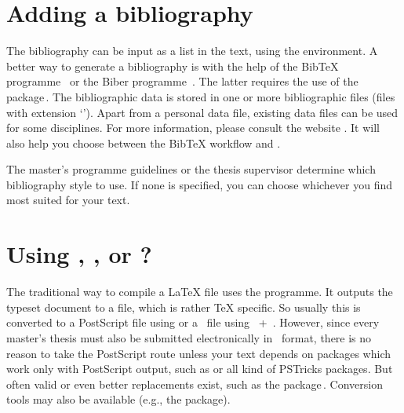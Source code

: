 \section{Adding a bibliography}\label{sec:bib}
The bibliography can be input as a list in the text, using the
 environment. A better way to generate a bibliography is
with the help of the BibTeX programme~\cite{tamethebeast} or the Biber
programme~\cite{pkg:biber}. The latter requires the use of the 
package\,\cite{pkg:biblatex}. The bibliographic data is stored in one or more
bibliographic files (files with extension `'). Apart from a personal
data file, existing data files can be used for some disciplines.
For more information, please consult the website . It will also help you choose between
the BibTeX workflow and . 

The master's programme guidelines or the thesis supervisor determine which
bibliography style to use. If none is specified, you can choose whichever you
find most suited for your text.

\section{Using , ,  or
  ?}\label{sec:engine}
The traditional way to compile a LaTeX file uses the  programme. It
outputs the typeset document to a  file, which is rather TeX
specific. So usually this is converted to a PostScript file using 
or a \PDF\ file using ~+~. However, since every
master's thesis must also be submitted electronically in \PDF~format, there is
no reason to take the PostScript route unless your text depends on packages
which work only with PostScript output, such as  or all kind of
PSTricks packages. But often valid or even better replacements exist, such as
the  package\,\cite{pkg:tikz}. Conversion tools may also be available
(e.g., the  package).

